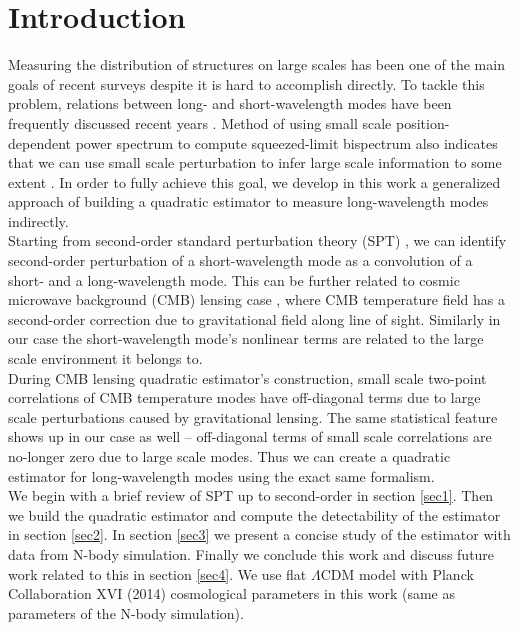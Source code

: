 \documentclass[prd,amsmath,amssymb,floatfix,superscriptaddress,nofootinbib,twocolumn]{revtex4-1}
\begin{document}
\section{Introduction}
Measuring the distribution of structures on large scales has been one of the main goals of recent surveys despite it is hard to accomplish directly. To tackle this problem, relations between long- and short-wavelength modes have been frequently discussed recent years \cite{Baldauf:2011fer}\cite{Barreira:2017res}. Method of using small scale position-dependent power spectrum to compute squeezed-limit bispectrum also indicates that we can use small scale perturbation to infer large scale information to some extent \cite{Chiang:2014pos}\cite{Chiang:2015poss}. In order to fully achieve this goal, we develop in this work a generalized approach of building a quadratic estimator to measure long-wavelength modes indirectly. \\
Starting from second-order standard perturbation theory (SPT) \cite{Goroff:1986sts}\cite{Makino:1992fs}\cite{Jain:1994sop}, we can identify second-order perturbation of a short-wavelength mode as a convolution of a short- and a long-wavelength mode. This can be further related to cosmic microwave background (CMB) lensing case \cite{Hu:2002mr}, where CMB temperature field has a second-order correction due to gravitational field along line of sight. Similarly in our case the short-wavelength mode's nonlinear terms are related to the large scale environment it belongs to.
\\
During CMB lensing quadratic estimator's construction, small scale two-point correlations of CMB temperature modes have off-diagonal terms due to large scale perturbations caused by gravitational lensing. The same statistical feature shows up in our case as well -- off-diagonal terms of small scale correlations are no-longer zero due to large scale modes. Thus we can create a quadratic estimator for long-wavelength modes using the exact same formalism. \\
We begin with a brief review of SPT up to second-order in section \ref{sec1}. Then we build the quadratic estimator and compute the detectability of the estimator in section \ref{sec2}. In section \ref{sec3} we present a concise study of the estimator with data from N-body simulation. Finally we conclude this work and discuss future work related to this in section \ref{sec4}. We use flat $\Lambda$CDM model with Planck Collaboration XVI (2014) \cite{Planck:2014cos} cosmological parameters in this work (same as parameters of the N-body simulation).
\end{document}
